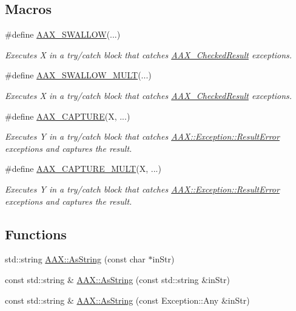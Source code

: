 \subsection*{Macros}
\begin{DoxyCompactItemize}
\item 
\#define \hyperlink{a00208_a8f177823e9388c5163d1b402a9069bce}{A\+A\+X\+\_\+\+S\+W\+A\+L\+L\+O\+W}(...)
\begin{DoxyCompactList}\small\item\em Executes {\itshape X} in a try/catch block that catches \hyperlink{a00019}{A\+A\+X\+\_\+\+Checked\+Result} exceptions. \end{DoxyCompactList}\item 
\#define \hyperlink{a00208_aef6db72a3774d079609f94720928cdd6}{A\+A\+X\+\_\+\+S\+W\+A\+L\+L\+O\+W\+\_\+\+M\+U\+L\+T}(...)
\begin{DoxyCompactList}\small\item\em Executes {\itshape X} in a try/catch block that catches \hyperlink{a00019}{A\+A\+X\+\_\+\+Checked\+Result} exceptions. \end{DoxyCompactList}\item 
\#define \hyperlink{a00208_af9972551e4546e894010f99eade68c94}{A\+A\+X\+\_\+\+C\+A\+P\+T\+U\+R\+E}(X, ...)
\begin{DoxyCompactList}\small\item\em Executes {\itshape Y} in a try/catch block that catches \hyperlink{a00147}{A\+A\+X\+::\+Exception\+::\+Result\+Error} exceptions and captures the result. \end{DoxyCompactList}\item 
\#define \hyperlink{a00208_a078be92d3d19a5a4b3da2b55ae5ac1c9}{A\+A\+X\+\_\+\+C\+A\+P\+T\+U\+R\+E\+\_\+\+M\+U\+L\+T}(X, ...)
\begin{DoxyCompactList}\small\item\em Executes {\itshape Y} in a try/catch block that catches \hyperlink{a00147}{A\+A\+X\+::\+Exception\+::\+Result\+Error} exceptions and captures the result. \end{DoxyCompactList}\end{DoxyCompactItemize}
\subsection*{Functions}
\begin{DoxyCompactItemize}
\item 
std\+::string \hyperlink{a00288_a8fbde5607de487515bcb55631bc1377d}{A\+A\+X\+::\+As\+String} (const char $\ast$in\+Str)
\item 
const std\+::string \& \hyperlink{a00288_a1bdf9d0d3be5b5f11d47df256a2e9490}{A\+A\+X\+::\+As\+String} (const std\+::string \&in\+Str)
\item 
const std\+::string \& \hyperlink{a00288_a9d87a7ed401f9deb8386a14c7bd8aaae}{A\+A\+X\+::\+As\+String} (const Exception\+::\+Any \&in\+Str)
\end{DoxyCompactItemize}


